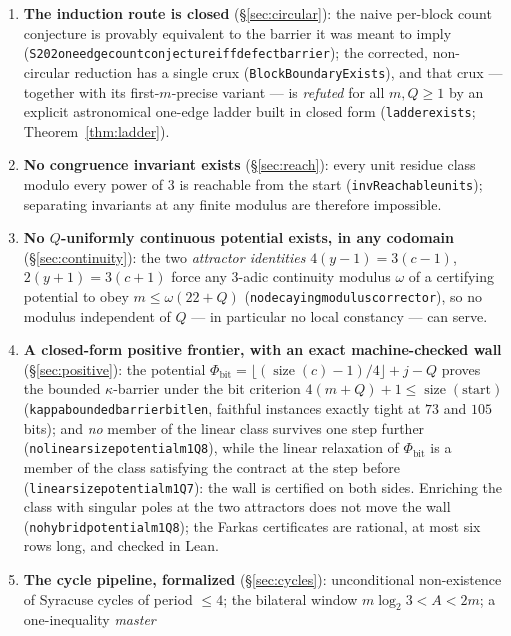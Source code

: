 \documentclass[11pt]{amsart}
\theoremstyle{definition}
\theoremstyle{remark}
\newcommand{\size}{\operatorname{size}}
\newcommand{\lean}[1]{{\def\_{\textunderscore\allowbreak}\texttt{#1}}}
\begin{document}
\begin{enumerate}
\item \textbf{The induction route is closed} (\S\ref{sec:circular}): the
  naive per-block count conjecture is provably equivalent to the barrier it
  was meant to imply
  (\lean{S202\_one\_edge\_count\_conjecture\_iff\_defect\_barrier}); the
  corrected, non-circular reduction has a single crux
  (\lean{BlockBoundaryExists}), and that crux --- together with its
  first-$m$-precise variant --- is \emph{refuted} for all $m, Q \ge 1$ by an
  explicit astronomical one-edge ladder built in closed form
  (\lean{ladder\_exists}; Theorem~\ref{thm:ladder}).
\item \textbf{No congruence invariant exists} (\S\ref{sec:reach}): every unit
  residue class modulo every power of $3$ is reachable from the start
  (\lean{invReachable\_units}); separating invariants at any finite modulus
  are therefore impossible.
\item \textbf{No $Q$-uniformly continuous potential exists, in any codomain}
  (\S\ref{sec:continuity}): the two \emph{attractor identities}
  $4(y-1)=3(c-1)$, $2(y+1)=3(c+1)$ force any $3$-adic continuity modulus
  $\omega$ of a certifying potential to obey $m \le \omega(22+Q)$
  (\lean{no\_decaying\_modulus\_corrector}), so no modulus independent of
  $Q$ --- in particular no local constancy --- can serve.
\item \textbf{A closed-form positive frontier, with an exact machine-checked
  wall} (\S\ref{sec:positive}): the potential
  $\Phi_{\mathrm{bit}} = \lfloor(\size(c)-1)/4\rfloor + j - Q$ proves the
  bounded $\kappa$-barrier under the bit criterion $4(m{+}Q)+1 \le
  \size(\text{start})$ (\lean{kappa\_bounded\_barrier\_bitlen}, faithful
  instances exactly tight at $73$ and $105$ bits); and \emph{no} member of
  the linear class survives one step further
  (\lean{no\_linear\_size\_potential\_m1\_Q8}), while the linear relaxation
  of $\Phi_{\mathrm{bit}}$ is a member of the class satisfying the contract
  at the step before (\lean{linear\_size\_potential\_m1\_Q7}): the wall is
  certified on both sides.  Enriching the class with singular poles at the
  two attractors does not move the wall (\lean{no\_hybrid\_potential\_m1\_Q8});
  the Farkas certificates are rational, at most six rows long, and checked
  in Lean.
\item \textbf{The cycle pipeline, formalized} (\S\ref{sec:cycles}):
  unconditional non-existence of Syracuse cycles of period $\le 4$; the
  bilateral window $m\log_2 3 < A < 2m$; a one-inequality \emph{master
}
\end{enumerate}
\end{document}
